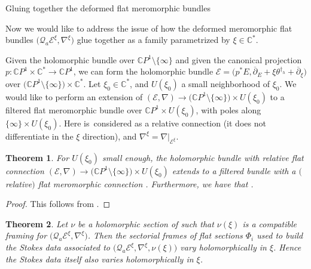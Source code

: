 \documentclass[11pt]{article}
\numberwithin{equation}{section}
\newtheorem{Theorem}{Theorem}[section]
\numberwithin{equation}{section}
\newcommand{\CP}{\mathbb{C}P^1}
\begin{document}
\begin{subsubsection}{Gluing together the deformed flat meromorphic bundles}

Now we would like to address the issue of how the deformed meromorphic flat bundles $\bigl(\mathcal{Q}_a\mathcal{E}^{\xi},\nabla^{\xi}\bigr)$ glue together as a family parametrized by $\xi \in \mathbb{C}^{*}$.

Given the holomorphic bundle  over $\CP\setminus \{\infty\}$ and given the canonical projection $p\colon\CP \times \mathbb{C}^*\to \CP$, we can form the holomorphic bundle $\mathcal{E}=\bigl(p^*E,\overline{\partial}_E+\xi \theta^{\dagger_h}+\overline{\partial}_{\xi}\bigr)$ over $\bigl(\CP\setminus \{\infty\} \bigr)\times \mathbb{C}^*$. Let $\xi_0 \in \mathbb{C}^*$, and $U(\xi_0)$ a small neighborhood of $\xi_0$. We would like to perform an extension of $(\mathcal{E},\nabla)\to \bigl(\CP\setminus \{\infty\}\bigr)\times U(\xi_0)$ to a filtered flat meromorphic bundle over $\CP\times U(\xi_0)$, with poles along $\{\infty\}\times U(\xi_0)$. Here \smash{$\nabla\colon \mathcal{E}\to \mathcal{E}\otimes \Omega^1_{(\CP\setminus \{\infty\})\times U(\xi_0)/U(\xi_0)}$} is~considered as a relative connection (it does not differentiate in the $\xi$ direction), and $\nabla^{\xi}=\nabla|_{\mathcal{E}^{\xi}}$.

\begin{Theorem} For $U(\xi_0)$ small enough, the holomorphic bundle with relative flat connection $(\mathcal{E},\nabla)\to \bigl(\CP \setminus \{\infty\}\bigr)\times U(\xi_0)$ extends to a filtered bundle with a $($relative$)$ flat meromorphic connection \smash{$\bigl(\mathcal{Q}_*^{(\xi_0)}\mathcal{E},\nabla\bigr)\to \bigl(\CP\times U(\xi_0),\{\infty\}\times U(\xi_0)\bigr)$}. Furthermore, we have that \smash{$\bigl(\mathcal{Q}_a^{(\xi_0)}\mathcal{E},\nabla\bigr)|_{\CP\times \{\xi\} }= \bigl(\mathcal{Q}_a\mathcal{E}^{\xi},\nabla^{\xi}\bigr)$}.
\end{Theorem}

\begin{proof}
This follows from \cite[Proposition 9.2.1, Corollary 9.2.5, and Theorem 11.1.2]{M}.
\end{proof}

\begin{Theorem} \label{holStokes} Let $\nu$ be a holomorphic section of  such that $\nu(\xi)$ is a compatible framing for $\bigl(\mathcal{Q}_a\mathcal{E}^{\xi},\nabla^{\xi}\bigr)$. Then the sectorial frames of flat sections $\Phi_i$ used to build the Stokes data associated to $\bigl(\mathcal{Q}_a\mathcal{E}^{\xi},\nabla^{\xi},\nu(\xi)\bigr)$ vary holomorphically in $\xi$. Hence the Stokes data itself also varies holomorphically in $\xi$.
\end{Theorem}


\end{subsubsection}
\end{document}

